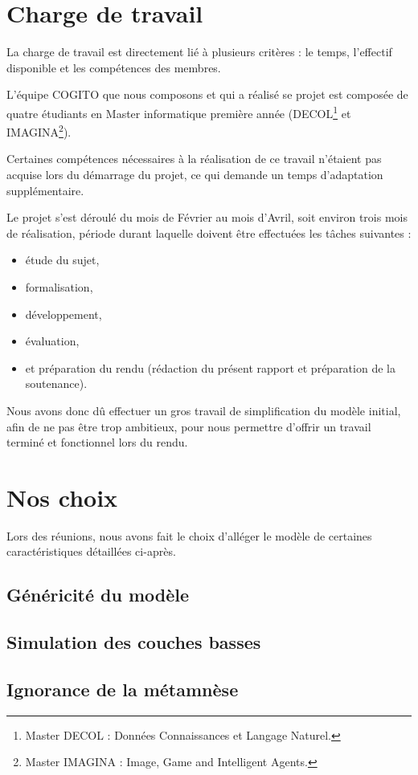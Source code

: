 \section{Charge de travail}
La charge de travail est directement lié à plusieurs critères : le temps, l'effectif disponible et les compétences des membres.

L'équipe COGITO que nous composons et qui a réalisé se projet est composée de quatre étudiants en Master informatique première année (DECOL\footnote{Master DECOL : Données Connaissances et Langage Naturel.} et IMAGINA\footnote{Master IMAGINA : Image, Game and Intelligent Agents.}).

Certaines compétences nécessaires à la réalisation de ce travail n'étaient pas acquise lors du démarrage du projet, ce qui demande un temps d'adaptation supplémentaire.

Le projet s'est déroulé du mois de Février au mois d'Avril, soit environ trois mois de réalisation, période durant laquelle doivent être effectuées les tâches suivantes :

\begin{itemize}
\item étude du sujet, 
\item formalisation, 
\item développement, 
\item évaluation,
\item et préparation du rendu (rédaction du présent rapport et préparation de la soutenance).
\end{itemize}

Nous avons donc dû effectuer un gros travail de simplification du modèle initial, afin de ne pas être trop ambitieux, pour nous permettre d'offrir un travail terminé et fonctionnel lors du rendu.

\section{Nos choix}

Lors des réunions, nous avons fait le choix d'alléger le modèle de certaines caractéristiques détaillées ci-après.

\subsection{Généricité du modèle}
\subsection{Simulation des couches basses}
\subsection{Ignorance de la métamnèse}